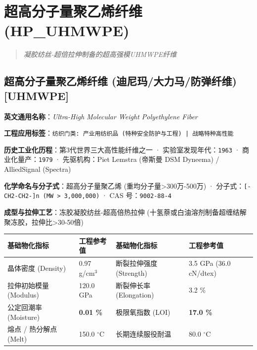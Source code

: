 \documentclass[11pt,openright,twoside,UTF8]{ctexbook}
\begin{document}
\chapter{超高分子量聚乙烯纤维 (HP\_UHMWPE)}
\begin{quote}
\small\itshape
凝胶纺丝-超倍拉伸制备的超高强模UHMWPE纤维
\end{quote}

\section{超高分子量聚乙烯纤维 (迪尼玛/大力马/防弹纤维) [UHMWPE]}
\label{sec:uhmwpe}

\noindent\textbf{英文通用名称}：\textit{Ultra-High Molecular Weight Polyethylene Fiber}\par
\noindent\textbf{工程应用标签}：\texttt{纺织门类: 产业用纺织品 (特种安全防护与工程) | 战略特种高性能}\par
\noindent\textbf{历史工业化历程}：第3代世界三大高性能纤维之一 · 实验室发现年代：\texttt{1963} · 商业化量产：\texttt{1979} · 先驱机构：Piet Lemstra (帝斯曼 DSM Dyneema) / AlliedSignal (Spectra)\par
\noindent\textbf{化学命名与分子式}：超高分子量聚乙烯 (重均分子量\textgreater{}300万-500万) · 分子式：\texttt{[-CH2-CH2-]n (MW \textgreater{} 3,000,000)} · CAS 号：\texttt{9002-88-4}\par
\noindent\textbf{成型与拉伸工艺}：冻胶凝胶纺丝-超高倍热拉伸 (十氢萘或白油溶剂制备超缠结解聚冻胶，拉伸比\textgreater{}30-50倍)\par

\vspace{0.15cm}
\begin{center}
\small
\begin{tabularx}{\textwidth}{p{3.8cm}Xp{3.8cm}X}
\toprule
\textbf{基础物化指标} & \textbf{工程参考值} & \textbf{基础物化指标} & \textbf{工程参考值} \\
\midrule
晶体密度 (Density) & 0.97 g/cm$^3$ & 断裂拉伸强度 (Strength) & 3.5 GPa (36.0 cN/dtex) \\
拉伸初始模量 (Modulus) & 120.0 GPa & 断裂伸长率 (Elongation) & 3.2 \% \\
公定回潮率 (Moisture) & \textbf{0.01 \%} & 极限氧指数 (LOI) & \textbf{17.0 \%} \\
熔点 / 热分解点 (Melt) & 150.0 $^\circ\mathrm{C}$ & 长期连续服役耐温 & 80.0 $^\circ\mathrm{C}$ \\
\bottomrule
\end{tabularx}
\end{center}
\vspace{0.15cm}
\end{document}
